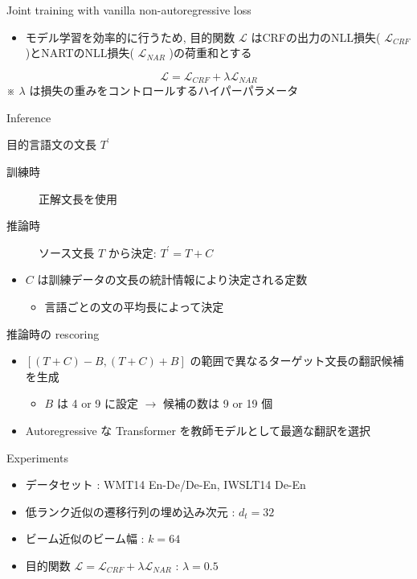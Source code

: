 \documentclass[unicode, 12pt, aspectratio=43]{beamer}
\begin{document}
\begin{frame}[label={sec:org63ae06b}]{\large Joint training with vanilla non-autoregressive loss}
\begin{itemize}
\item モデル学習を効率的に行うため, 目的関数 \(\mathcal{L}\) はCRFの出力のNLL損失( \(\mathcal{L}_{CRF}\) )とNARTのNLL損失( \(\mathcal{L}_{NAR}\) )の荷重和とする
\end{itemize}

\begin{equation*}
    \mathcal{L} = \mathcal{L}_{CRF} + \lambda \mathcal{L}_{NAR}
\end{equation*}
※ \(\lambda\) は損失の重みをコントロールするハイパーパラメータ
\end{frame}

\begin{frame}[label={sec:orgb83db11}]{Inference}
\begin{block}{目的言語文の文長 \(T^\prime\)}
\begin{description}
\item[{訓練時}] 正解文長を使用
\item[{推論時}] ソース文長 \(T\) から決定: \(T^\prime = T+C\)
\end{description}
\begin{itemize}
\item \(C\) は訓練データの文長の統計情報により決定される定数
\begin{itemize}
\item 言語ごとの文の平均長によって決定
\end{itemize}
\end{itemize}
\end{block}

\begin{block}{推論時の rescoring}
\begin{itemize}
\item \([(T+C)-B, (T+C) + B]\) の範囲で異なるターゲット文長の翻訳候補を生成
\begin{itemize}
\item \(B\) は 4 or 9 に設定 \(\rightarrow\) 候補の数は 9 or 19 個
\end{itemize}
\item Autoregressive な Transformer を教師モデルとして最適な翻訳を選択
\end{itemize}
\end{block}
\end{frame}

\begin{frame}[label={sec:org4803543}]{Experiments}
\begin{itemize}
\item データセット : WMT14 En-De/De-En, IWSLT14 De-En
\item 低ランク近似の遷移行列の埋め込み次元 : \(d_t = 32\)
\item ビーム近似のビーム幅 : \(k = 64\)
\item 目的関数 \(\mathcal{L} = \mathcal{L}_{CRF} + \lambda \mathcal{L}_{NAR}\) : \(\lambda = 0.5\)
\end{itemize}
\end{frame}
\end{document}
